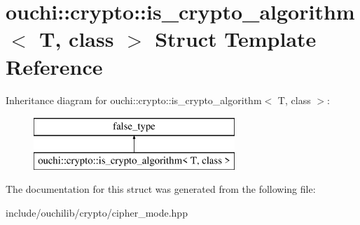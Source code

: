 \hypertarget{structouchi_1_1crypto_1_1is__crypto__algorithm}{}\section{ouchi\+::crypto\+::is\+\_\+crypto\+\_\+algorithm$<$ T, class $>$ Struct Template Reference}
\label{structouchi_1_1crypto_1_1is__crypto__algorithm}
Inheritance diagram for ouchi\+::crypto\+::is\+\_\+crypto\+\_\+algorithm$<$ T, class $>$\+:\begin{figure}[H]
\begin{center}
\leavevmode
\includegraphics[height=2.000000cm]{structouchi_1_1crypto_1_1is__crypto__algorithm}
\end{center}
\end{figure}


The documentation for this struct was generated from the following file\+:\begin{DoxyCompactItemize}
\item 
include/ouchilib/crypto/cipher\+\_\+mode.\+hpp\end{DoxyCompactItemize}
